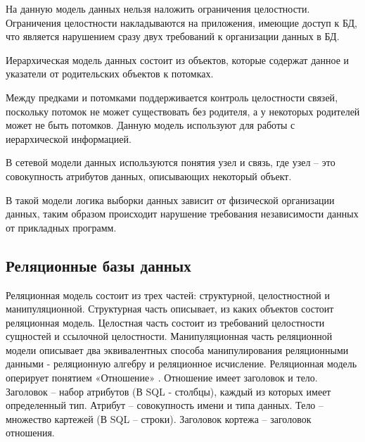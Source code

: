На данную модель данных нельзя наложить ограничения целостности\cite{bd:2023}. Ограничения целостности накладываются на приложения, имеющие доступ к БД, что является нарушением сразу двух требований к организации данных в БД.

Иерархическая модель данных состоит из объектов, которые содержат данное и указатели от родительских объектов к потомках. 


Между предками и потомками поддерживается контроль целостности связей\cite{dm}, поскольку потомок не может существовать без родителя, а у некоторых родителей может не быть потомков. Данную модель используют для работы с иерархической информацией\cite{dm}. 

В сетевой модели данных используются понятия узел и связь, где узел -- это совокупность атрибутов данных, описывающих некоторый объект\cite{bd:2023}. 


В такой модели логика выборки данных зависит от физической организации данных\cite{bd:2023}, таким образом происходит нарушение требования независимости данных от прикладных программ. 

\subsection{Реляционные базы данных}

Реляционная модель состоит из трех частей: структурной, целостностной и манипуляционной\cite{bd:2023}. 
Структурная часть описывает, из каких объектов состоит реляционная модель. 
Целостная часть состоит из требований целостности сущностей и ссылочной целостности.
Манипуляционная часть реляционной модели описывает два эквивалентных способа
манипулирования реляционными данными - реляционную алгебру и реляционное исчисление.
Реляционная модель оперирует понятием «Отношение» \cite{bd:2023}. 
Отношение имеет заголовок и тело. 
Заголовок – набор атрибутов (В SQL - столбцы), каждый из которых имеет определенный тип. 
Атрибут – совокупность имени и типа данных. 
Тело – множество картежей (В SQL – строки). 
Заголовок кортежа – заголовок отношения.

